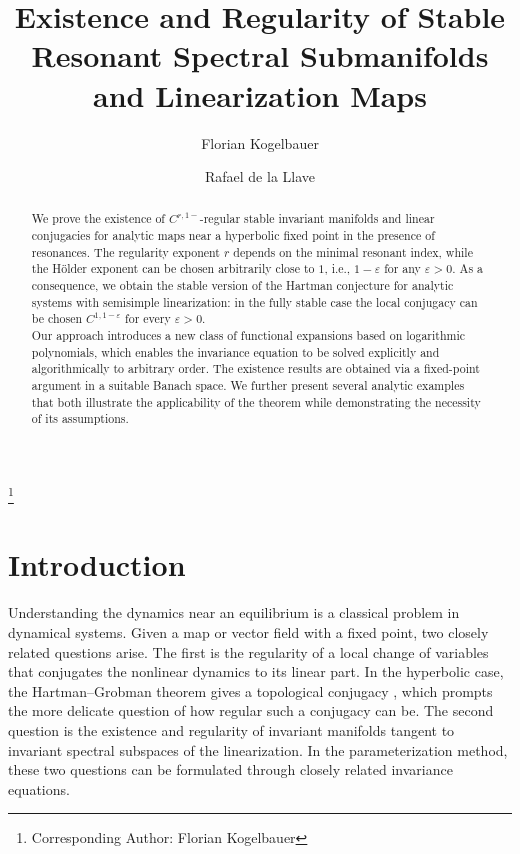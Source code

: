 \documentclass{amsart}
\theoremstyle{plain}
\theoremstyle{definition}
\begin{document}
\title[Resonant Spectral Submanifolds]{Existence and Regularity of Stable Resonant Spectral Submanifolds and Linearization Maps}
\author{Florian Kogelbauer}
\thanks{Corresponding Author: Florian Kogelbauer}
\address{Department of Mathematics, ETH Z\"{u}rich, R\"{a}mistrasse 101, 8092 Z\"{u}rich, Switzerland}
\author{Rafael de la Llave}
\address{School of Mathematics, Georgia Institute of Technology, 30332-0160 Atlanta, Georgia}



\begin{abstract}
We prove the existence of $C^{r,1-}$-regular stable invariant manifolds and linear conjugacies for analytic maps near a hyperbolic fixed point in the presence of resonances. The regularity exponent $r$ depends on the minimal resonant index, while the H\"older exponent can be chosen arbitrarily close to $1$, i.e., $1-\varepsilon$ for any $\varepsilon>0$. As a consequence, we obtain the stable version of the Hartman conjecture for analytic systems with semisimple linearization: in the fully stable case the local conjugacy can be chosen $C^{1,1-\varepsilon}$ for every $\varepsilon>0$.\\
Our approach introduces a new class of functional expansions based on logarithmic polynomials, which enables the invariance equation to be solved explicitly and algorithmically to arbitrary order. The existence results are obtained via a fixed-point argument in a suitable Banach space. We further present several analytic examples that both illustrate the applicability of the theorem while demonstrating the necessity of its assumptions.
\end{abstract}

\maketitle

\section{Introduction}


Understanding the dynamics near an equilibrium is a classical problem in dynamical systems. Given a map or vector field with a fixed point, two closely related questions arise. The first is the regularity of a local change of variables that conjugates the nonlinear dynamics to its linear part. In the hyperbolic case, the Hartman--Grobman theorem gives a topological conjugacy \cite{grobman1959homeomorphism,hartman1960lemma,hartman1960local}, which prompts the more delicate question of how regular such a conjugacy can be. The second question is the existence and regularity of invariant manifolds tangent to invariant spectral subspaces of the linearization. In the parameterization method, these two questions can be formulated through closely related invariance equations.\\
\end{document}
